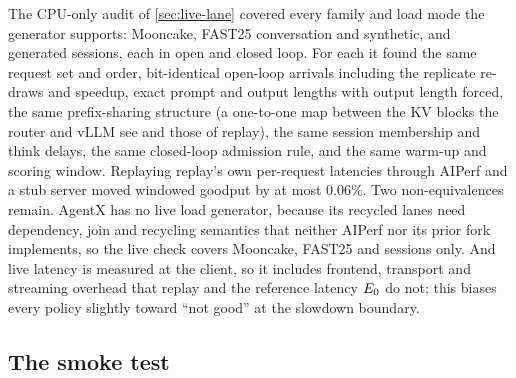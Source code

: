 The CPU-only audit of \cref{sec:live-lane} covered every family and load mode the generator
supports: Mooncake, FAST25 conversation and synthetic, and generated sessions, each in open and
closed loop. For each it found the same request set and order, bit-identical open-loop arrivals
including the replicate re-draws and speedup, exact prompt and output lengths with output length
forced, the same prefix-sharing structure (a one-to-one map between the KV blocks the router and
vLLM see and those of replay), the same session membership and think delays, the same closed-loop
admission rule, and the same warm-up and scoring window. Replaying replay's own per-request
latencies through AIPerf and a stub server moved windowed goodput by at most 0.06\%. Two
non-equivalences remain. AgentX has no live load generator, because its recycled lanes need
dependency, join and recycling semantics that neither AIPerf nor its prior fork implements, so the
live check covers Mooncake, FAST25 and sessions only. And live latency is measured at the client, so
it includes frontend, transport and streaming overhead that replay and the reference latency
$E_0$ do not; this biases every policy slightly toward ``not good'' at the slowdown boundary.

\subsection{The smoke test}

